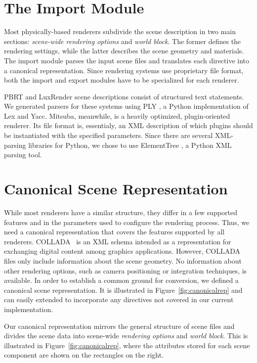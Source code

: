 \section{The Import Module}

Most physically-based renderers subdivide the scene description in two main sections: {\it scene-wide rendering options} and {\it world block}. The former defines the rendering settings, while the latter describes the scene geometry and materials. The import module parses the input scene files and translates each directive into a canonical representation. Since rendering systems use proprietary file format, both the import and export modules have to be specialized for each renderer. 

PBRT and LuxRender scene descriptions consist of structured text statements. We generated parsers for these systems using PLY \cite{ply}, a Python implementation of Lex and Yacc. Mitsuba, meanwhile, is a heavily optimized, plugin-oriented renderer. Its file format is, essentialy, an XML description of which plugins should be instantiated with the specified parameters. Since there are several XML-parsing libraries for Python, we chose to use ElementTree \cite{ET}, a Python XML parsing tool.

\section{Canonical Scene Representation}
While most renderers have a similar structure, they differ in a few supported features and in the parameters used to configure the rendering process. Thus, we need a canonical representation that covers the features supported by all renderers. COLLADA~\cite{collada} is an XML schema intended as a representation for exchanging digital content among graphics applications. However, COLLADA files only include information about the scene geometry. No information about other rendering options, such as camera positioning or integration techniques, is available. 
In order to establish a common ground for conversion, we defined a canonical scene representation. It is illustrated in Figure~\ref{fig:canonicalrep} and can easily extended to incorporate any directives not covered in our current implementation.
 
Our canonical representation mirrors the general structure of scene files and divides the scene data into scene-wide {\it rendering options} and {\it world block}. This is illustrated in Figure~\ref{fig:canonicalrep}, where the attributes stored for each scene component are shown on the rectangles on the right.

